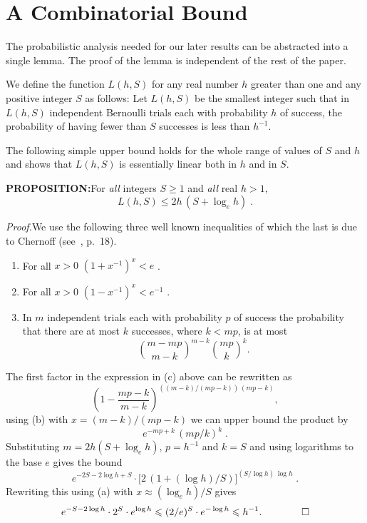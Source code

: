 \section{A Combinatorial Bound}

The probabilistic analysis needed for our later results can be abstracted into a single
lemma. The proof of the lemma is independent of the rest of the paper.

We define the function $L(h,S)$ for any real number $h$ greater than one and any positive
integer $S$ as follows: Let $L(h,S)$ be the smallest integer such that in $L(h,S)$ independent
Bernoulli trials each with probability $h$ of success, the probability of having fewer than $S$
successes is less than $h^{-1}$.

The following simple upper bound holds for the whole range of values of $S$ and $h$ and shows
that $L(h,S)$ is essentially linear both in $h$ and in $S$.

\medskip

\noindent\textbf{PROPOSITION:}\quad For \emph{all} integers $S \geqslant 1$ and \emph{all} real $h > 1$,
\[
  L(h,S) \leqslant 2h\,(S + \log_e h) \;.
\]

\noindent\textit{Proof.}\quad We use the following three well known inequalities of which the last is due to Chernoff
(see~\cite{5}, p.~18).

\begin{enumerate}
\item[(a)] For all \quad $x > 0$ \quad $(1 + x^{-1})^x < e$ \;.
\item[(b)] For all \quad $x > 0$ \quad $(1 - x^{-1})^x < e^{-1}$ \;.
\item[(c)] In $m$ independent trials each with probability $p$ of success the probability that
there are at most $k$ successes, where $k < mp$, is at most
\[
  \binom{m - mp}{m - k}^{m-k} \binom{mp}{k}^k .
\]
\end{enumerate}

The first factor in the expression in (c) above can be rewritten as
\[
  \left(1 - \frac{mp - k}{m - k}\right)^{((m-k)/(mp-k))\,(mp-k)} ,
\]
using (b) with $x = (m{-}k)/(mp{-}k)$ we can upper bound the product by
\[
  e^{-mp+k}\,(mp/k)^k \;.
\]
Substituting $m = 2h(S + \log_e h)$, $p = h^{-1}$ and $k = S$ and using logarithms to the base $e$ gives the bound
\[
  e^{-2S - 2\log h + S} \cdot \bigl[2\,(1 + (\log h)/S)\bigr]^{(S/\log h)\,\log h} \;.
\]
Rewriting this using (a) with $x \approx (\log_e h)/S$ gives
\[
  e^{-S - 2\log h} \cdot 2^S \cdot e^{\log h} \leqslant (2/e)^S \cdot e^{-\log h} \leqslant h^{-1} . \qquad \qed
\]

